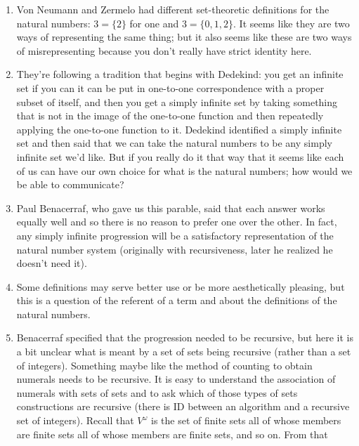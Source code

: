 \documentclass[12pt]{article}
\theoremstyle{definition}
\begin{document}
\begin{enumerate}
    \itemsep0em 
    \item 
        Von Neumann and Zermelo had different set-theoretic definitions for the
        natural numbers: $3 = \{2\}$ for one and $3 = \{0,1,2\}$. It seems like
        they are two ways of representing the same thing; but it also seems
        like these are two ways of misrepresenting because you don't really
        have strict identity here.
    \item
        They're following a tradition that begins with Dedekind: you get an
        infinite set if you can it can be put in one-to-one correspondence with
        a proper subset of itself, and then you get a simply infinite set by
        taking something that is not in the image of the one-to-one function
        and then repeatedly applying the one-to-one function to it. Dedekind
        identified a simply infinite set and then said that we can take the
        natural numbers to be any simply infinite set we'd like. But if you
        really do it that way that it seems like each of us can have our own
        choice for what is the natural numbers; how would we be able to
        communicate? 
    \item
        Paul Benacerraf, who gave us this parable, said that each answer works
        equally well and so there is no reason to prefer one over the other. In
        fact, any simply infinite progression will be a satisfactory
        representation of the natural number system (originally with
        recursiveness, later he realized he doesn't need it). 
    \item
        Some definitions may serve better use or be more aesthetically
        pleasing, but this is a question of the referent of a term and about
        the definitions of the natural numbers.
    \item
        Benacerraf specified that the progression needed to be recursive, but
        here it is a bit unclear what is meant by a set of sets being recursive
        (rather than a set of integers). Something maybe like the method of
        counting to obtain numerals needs to be recursive. It is easy to
        understand the association of numerals with sets of sets and to ask
        which of those types of sets constructions are recursive (there is ID
        between an algorithm and a recursive set of integers). Recall that
        $V^\omega$ is the set of finite sets all of whose members are finite
        sets all of whose members are finite sets, and so on. From that

\end{enumerate}
\end{document}
